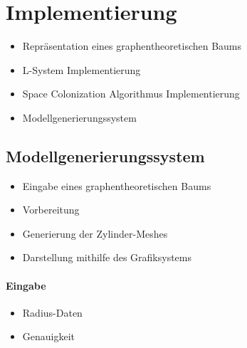 
\newpage
\slidetitle{}
\section{Implementierung\\}
\begin{itemize}
	\item Repräsentation eines graphentheoretischen Baums\\
	
	\item L-System Implementierung\\
	
	\item Space Colonization Algorithmus Implementierung\\
	
	\item Modellgenerierungssystem
\end{itemize}




\newpage
\slidetitle{}
\subsection{Modellgenerierungssystem \\}
\begin{itemize}
	\item Eingabe eines graphentheoretischen Baums\\
	
	\item Vorbereitung \\
	
	\item Generierung der Zylinder-Meshes\\
	
	\item Darstellung mithilfe des Grafiksystems
\end{itemize}





\newpage
{}
\paragraph{Eingabe\\ }
\begin{itemize}
	\item Radius-Daten
	\item Genauigkeit \\
\end{itemize}
